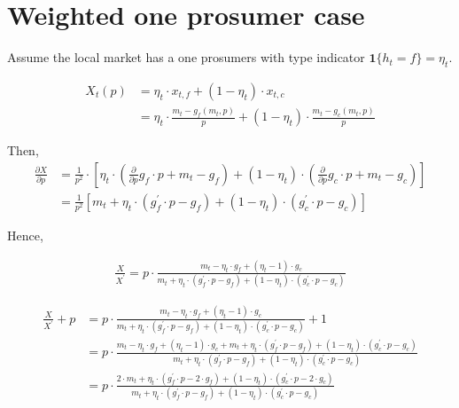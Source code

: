 \documentclass[american]{scrartcl}
\begin{document}
\iffalse %

    \section{Weighted one prosumer case}

    Assume the local market has a one prosumers with type indicator $\mathbf{1}\{h_t = f\} = \eta_t$.

    \begin{equation}
        \begin{split}
            X_t(p) &= \eta_t \cdot x_{t, f} + (1 - \eta_t) \cdot x_{t, c} \\
            &= \eta_t \cdot \frac{m_t - g_f(m_t, p)}{p} + (1 - \eta_t) \cdot \frac{m_t - g_c(m_t, p)}{p}
        \end{split}
    \end{equation}


    Then,
    \begin{equation}
        \begin{split}
            \frac{\partial X}{\partial p} &= \frac{1}{p^2} \cdot \left[ \eta_t \cdot \left(\frac{\partial}{\partial p} g_f \cdot p + m_t - g_f \right) + (1 - \eta_t) \cdot \left(\frac{\partial}{\partial p} g_c \cdot p + m_t - g_c \right) \right] \\
            &=\frac{1}{p^2} \left[m_t + \eta_t \cdot \left( g^\prime_f \cdot p - g_f \right) + (1 - \eta_t) \cdot \left( g^\prime_c \cdot p - g_c \right) \right]
        \end{split}
    \end{equation}

    Hence,

    \begin{equation}
        \begin{split}
            \frac{X}{X^\prime} = p \cdot \frac{m_t - \eta_t \cdot g_f + (\eta_t - 1) \cdot g_c}{m_t + \eta_t \cdot ( g^\prime_f \cdot p - g_f ) + (1 - \eta_t) \cdot (g^\prime_c \cdot p - g_c)}
        \end{split}
    \end{equation}

    \begin{equation}
        \begin{split}
            \frac{X}{X^\prime} + p &= p \cdot \frac{m_t - \eta_t \cdot g_f + (\eta_t - 1) \cdot g_c}{m_t + \eta_t \cdot ( g^\prime_f \cdot p - g_f ) + (1 - \eta_t) \cdot (g^\prime_c \cdot p - g_c)} + 1 \\
            &= p \cdot  \frac{m_t - \eta_t \cdot g_f + (\eta_t - 1) \cdot g_c + m_t + \eta_t \cdot ( g^\prime_f \cdot p - g_f ) + (1 - \eta_t) \cdot (g^\prime_c \cdot p - g_c)}{m_t + \eta_t \cdot ( g^\prime_f \cdot p - g_f ) + (1 - \eta_t) \cdot (g^\prime_c \cdot p - g_c)} \\
            &= p \cdot \frac{2 \cdot m_t + \eta_t \cdot (g^\prime_f \cdot p - 2\cdot g_f) + (1 - \eta_t) \cdot (g^\prime_c \cdot p - 2\cdot g_c)}{m_t + \eta_t \cdot ( g^\prime_f \cdot p - g_f ) + (1 - \eta_t) \cdot (g^\prime_c \cdot p - g_c)}
        \end{split}
    \end{equation}
\end{document}
